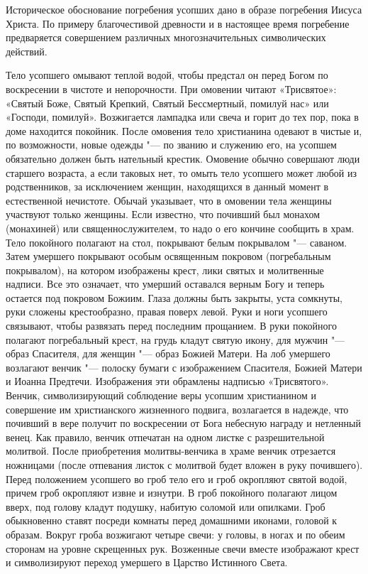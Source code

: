 Историческое обоснование погребения усопших дано в образе погребения Иисуса Христа. По примеру благочестивой древности и в настоящее время погребение предваряется совершением различных многозначительных символических действий. 

Тело усопшего омывают теплой водой, чтобы предстал он перед Богом по воскресении в чистоте и непорочности. При омовении читают «Трисвятое»: «Святый Боже, Святый Крепкий, Святый Бессмертный, помилуй нас» или «Господи, помилуй». Возжигается лампадка или свеча и горит до тех пор, пока в доме находится покойник. После омовения тело христианина одевают в чистые и, по возможности, новые одежды "--- по званию и служению его, на усопшем обязательно должен быть нательный крестик. Омовение обычно совершают люди старшего возраста, а если таковых нет, то омыть тело усопшего может любой из родственников, за исключением женщин, находящихся в данный момент в естественной нечистоте. Обычай указывает, что в омовении тела женщины участвуют только женщины. Если известно, что почивший был монахом (монахиней) или священнослужителем, то надо о его кончине сообщить в храм. Тело покойного полагают на стол, покрывают белым покрывалом "--- саваном. Затем умершего покрывают особым освященным покровом (погребальным покрывалом), на котором изображены крест, лики святых и молитвенные надписи. Все это означает, что умерший оставался верным Богу и теперь остается под покровом Божиим. Глаза должны быть закрыты, уста сомкнуты, руки сложены крестообразно, правая поверх левой. Руки и ноги усопшего связывают, чтобы развязать перед последним прощанием. В руки покойного полагают погребальный крест, на грудь кладут святую икону, для мужчин "--- образ Спасителя, для женщин "--- образ Божией Матери. На лоб умершего возлагают венчик "--- полоску бумаги с изображением Спасителя, Божией Матери и Иоанна Предтечи. Изображения эти обрамлены надписью «Трисвятого». Венчик, символизирующий соблюдение веры усопшим христианином и совершение им христианского жизненного подвига, возлагается в надежде, что почивший в вере получит по воскресении от Бога небесную награду и нетленный венец. Как правило, венчик отпечатан на одном листке с разрешительной молитвой. После приобретения молитвы-венчика в храме венчик отрезается ножницами (после отпевания листок с молитвой будет вложен в руку почившего). Перед положением усопшего во гроб тело его и гроб окропляют святой водой, причем гроб окропляют извне и изнутри. В гроб покойного полагают лицом вверх, под голову кладут подушку, набитую соломой или опилками. Гроб обыкновенно ставят посреди комнаты перед домашними иконами, головой к образам. Вокруг гроба возжигают четыре свечи: у головы, в ногах и по обеим сторонам на уровне скрещенных рук. Возженные свечи вместе изображают крест и символизируют переход умершего в Царство Истинного Света. 

